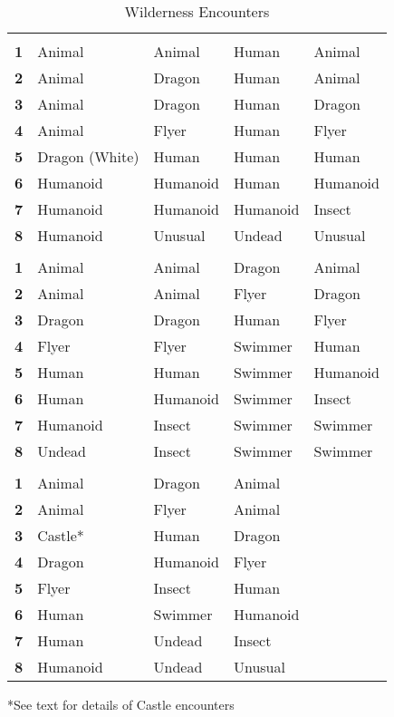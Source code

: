 \begin {table}[H]
  \caption{Wilderness Encounters}\label{tab:Wilderness Encounters}
  \begin{tabularx}{\columnwidth}{>{\bfseries}YYYYY}
	 &  &  &  & \\
	1 & Animal & Animal & Human & Animal\\
	2 & Animal & Dragon & Human & Animal\\
	3 & Animal & Dragon & Human & Dragon\\
	4 & Animal & Flyer & Human & Flyer\\
	5 & Dragon (White) & Human & Human & Human\\
	6 & Humanoid & Humanoid & Human & Humanoid\\
	7 & Humanoid & Humanoid & Humanoid & Insect\\
	8 & Humanoid & Unusual & Undead & Unusual\\
	 &  &  &  & \\
	1 & Animal & Animal & Dragon & Animal\\
	2 & Animal & Animal & Flyer & Dragon\\
	3 & Dragon & Dragon & Human & Flyer\\
	4 & Flyer & Flyer & Swimmer & Human\\
	5 & Human & Human & Swimmer & Humanoid\\
	6 & Human & Humanoid & Swimmer & Insect\\
	7 & Humanoid & Insect & Swimmer & Swimmer\\
	8 & Undead & Insect & Swimmer & Swimmer\\
	 &  &  & \\
	1 & Animal & Dragon & Animal\\ 
	2 & Animal & Flyer & Animal\\
	3 & Castle* & Human & Dragon\\
	4 & Dragon & Humanoid & Flyer\\ 
	5 & Flyer & Insect & Human\\
	6 & Human & Swimmer & Humanoid\\ 
	7 & Human & Undead & Insect\\
	8 & Humanoid & Undead & Unusual
  \end {tabularx}
	*See text for details of Castle encounters
\end {table}

